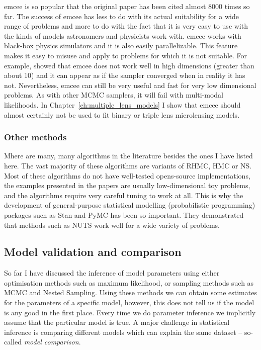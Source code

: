 \documentclass[12pt,dvipsnames]{report}
\newcommand{\ssf}[1]{\textsf{#1}}
\begin{document}
\ssf{emcee} is so popular that the 
original paper has been cited almost 8000 times so far.  
The success of \ssf{emcee} has less to do with its actual suitability 
for a wide range  of problems and more to do with the fact that it is very easy to use with the 
kinds of models astronomers and physicists work with. \ssf{emcee}  works with
black-box physics simulators and it is also easily parallelizable. 
This feature makes it easy to misuse and apply to problems for which it is 
not suitable. For example, \citet{arXiv:1509.02230} showed that \ssf{emcee} 
does not work well in high dimensions (greater than about 10) and it can appear 
as if the sampler converged when in reality it has not. Nevertheless, 
\ssf{emcee} can still be very useful and fast for very low dimensional 
problems. As with other MCMC samplers, it will fail with multi-modal 
likelihoods.
In Chapter~\ref{ch:multiple_lens_models} I show that \ssf{emcee} should almost certainly 
not be used to fit binary or triple lens microlensing models.


\subsubsection{Other methods}
Mhere are many, many algorithms in the literature besides the ones I have listed here. 
The vast majority of these  algorithms are variants of RHMC, HMC or  
NS. Most of these algorithms do not have well-tested opens-source implementations, 
the examples presented in the papers are usually low-dimensional toy 
problems, and the algorithms require very careful tuning to work at all. This 
is why the development of general-purpose statistical modelling 
(probabilistic programming) packages such as \ssf{Stan} and 
\ssf{PyMC} has been so important. They demonstrated that methods such as 
NUTS work well for a wide variety of problems.

\subsection{Model validation and comparison}
\label{ssec:model_comparison}

So far I have discussed the inference of model parameters using either optimisation 
methods such as maximum likelihood, or sampling methods such as MCMC and Nested 
Sampling.
Using these methods we can obtain some estimates for the parameters of a specific  
model, however, this does not tell us if the model is any good in the first place.
Every time we do parameter inference we implicitly assume that the particular model
is true.
A major challenge in statistical inference is comparing different 
models which can explain the same dataset -- so-called \emph{model comparison}.
\end{document}

